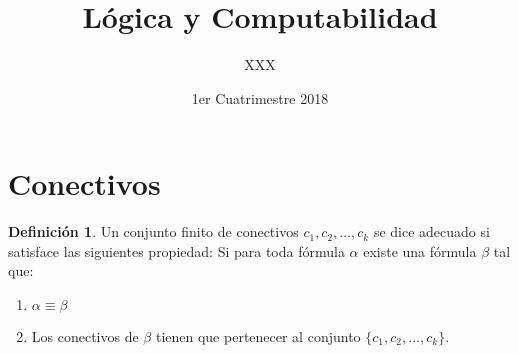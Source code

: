 \documentclass[a4paper,11pt]{article}
\title{Lógica y Computabilidad}
\author{XXX}
\date{1er Cuatrimestre 2018}
\theoremstyle{definition}
\newtheorem{defn}{Definición}[section]
\theoremstyle{remark}
\begin{document}
\maketitle

\section{Conectivos}

\begin{defn}
Un conjunto finito de conectivos $c_1, c_2, \dots, c_k$ se dice adecuado
si satisface las siguientes propiedad: Si para toda fórmula $\alpha$
existe una fórmula $\beta$ tal que:
\begin{enumerate}
\item $\alpha \equiv \beta$
\item Los conectivos de $\beta$ tienen que pertenecer al conjunto 
$\{c_1, c_2, \dots, c_k\}$.
\end{enumerate}
\end{defn}
\end{document}
